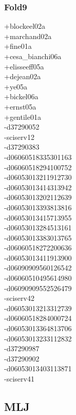 \begin{multicols}{4}
\subsubsection*{Fold9}
+blockeel02a\\
+marchand02a\\
+fine01a\\
+cesa\_bianchi06a\\
+elisseeff05a\\
+dejean02a\\
+ye05a\\
+bickel06a\\
+ernst05a\\
+gentile01a\\
-d37290052\\
-sciserv12\\
-d37290383\\
-d06060518335301163\\
-d06060518294100752\\
-d06053013211912730\\
-d06053013414313942\\
-d06053013202112639\\
-d06053013393813816\\
-d06053013415713955\\
-d06053013284513161\\
-d06053013383013765\\
-d06060518272200636\\
-d06053013411913900\\
-d06090909560126542\\
-d06060510495614980\\
-d06090909552526479\\
-sciserv42\\
-d06053013213312739\\
-d06060518284000724\\
-d06053013364813706\\
-d06053013233112832\\
-d37290987\\
-d37290902\\
-d06053013403113871\\
-sciserv41

\clearpage
\subsection{MLJ}
\vspace{.5cm}


\end{multicols}
